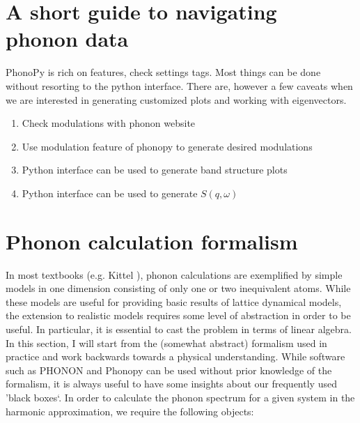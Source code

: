 \chapter{A short guide to navigating phonon data}

PhonoPy is rich on features, check settings tags. Most things can be done without resorting to the python interface. There are, however a few caveats when we are interested in generating customized plots and working with eigenvectors.

\begin{enumerate}
    \item Check modulations with phonon website
    \item Use modulation feature of phonopy to generate desired modulations
    \item Python interface can be used to generate band structure plots
    \item Python interface can be used to generate $S(q,\omega)$
\end{enumerate}

\chapter{Phonon calculation formalism}
\newcommand{\jp}{j^\prime}
\newcommand{\jpp}{j^{\prime\prime}}
\newcommand{\lp}{l^\prime}
\newcommand{\lpp}{l^{\prime\prime}}
\newcommand{\fc}{\bm{\Phi}\genfrac{(}{)}{0pt}{}{j \jp}{l \lp}}
\newcommand{\fcb}{\bm{\Theta}\genfrac{(}{)}{0pt}{}{j \jp}{l \lp}}
\newcommand{\fcbpp}{\bm{\Theta}\genfrac{(}{)}{0pt}{}{j \jpp}{l \lpp}}
\newcommand{\fcbf}{-\bm{\Theta}\genfrac{(}{)}{0pt}{}{j \jp}{l \lp} + \delta_{j,\jp} \delta_{l,\lp} \sum_{\jpp, \lpp}  \bm{\Theta}\genfrac{(}{)}{0pt}{}{j \jpp}{l \lpp} }


In most textbooks (e.g. Kittel \cite{Kittel2005}), phonon calculations are exemplified by simple models in one dimension consisting of only one or two inequivalent atoms. While these models are useful for providing basic results of lattice dynamical models, the extension to realistic models requires some level of abstraction in order to be useful. In particular, it is essential to cast the problem in terms of linear algebra. In this section, I will start from the (somewhat abstract) formalism used in practice and work backwards towards a physical understanding. While software such as PHONON \cite{Parlinski1997} and Phonopy \cite{Togo2015} can be used without prior knowledge of the formalism, it is always useful to have some insights about our frequently used 'black boxes`. In order to calculate the phonon spectrum for a given system in the harmonic approximation, we require the following objects:

